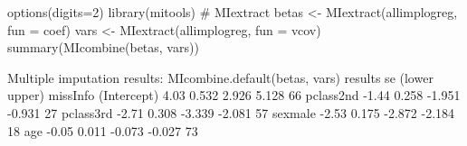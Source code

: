 \begin{Schunk}
\begin{Sinput}
 options(digits=2)
 library(mitools) # MIextract
 betas <- MIextract(allimplogreg, fun = coef)
 vars <- MIextract(allimplogreg, fun = vcov)
 summary(MIcombine(betas, vars))
\end{Sinput}
\begin{Soutput}
Multiple imputation results:
      MIcombine.default(betas, vars)
            results    se (lower upper) missInfo
(Intercept)    4.03 0.532  2.926  5.128     66 %
pclass2nd     -1.44 0.258 -1.951 -0.931     27 %
pclass3rd     -2.71 0.308 -3.339 -2.081     57 %
sexmale       -2.53 0.175 -2.872 -2.184     18 %
age           -0.05 0.011 -0.073 -0.027     73 %
\end{Soutput}
\end{Schunk}
